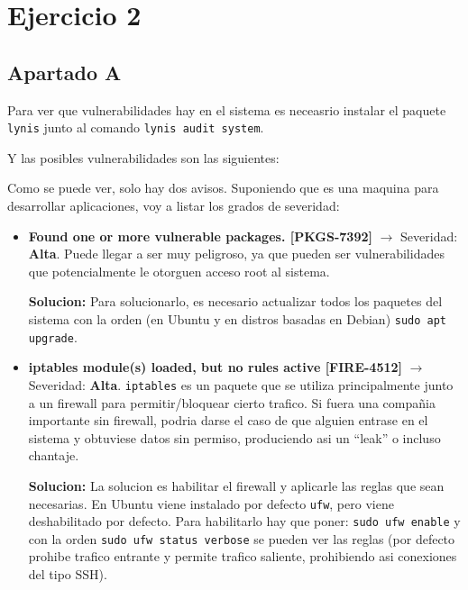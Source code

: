\documentclass{article}
\begin{document}

\section*{Ejercicio 2}
\subsection*{Apartado A}
Para ver que vulnerabilidades hay en el sistema es neceasrio instalar el paquete \verb|lynis| junto al comando \verb|lynis audit system|.


Y las posibles vulnerabilidades son las siguientes:


Como se puede ver, solo hay dos avisos. Suponiendo que es una maquina para desarrollar aplicaciones, voy a listar los grados de severidad:

\begin{itemize}
    \item \textbf{Found one or more vulnerable packages. [PKGS-7392]} $\rightarrow$ Severidad: \textbf{Alta}. Puede llegar a ser muy peligroso, ya que pueden ser vulnerabilidades que potencialmente le otorguen acceso root al sistema. 
    
    \textbf{Solucion: }Para solucionarlo, es necesario actualizar todos los paquetes del sistema con la orden (en Ubuntu y en distros basadas en Debian) \verb|sudo apt upgrade|.


    \item \textbf{iptables module(s) loaded, but no rules active [FIRE-4512]} $\rightarrow$ Severidad: \textbf{Alta}. \verb|iptables| es un paquete que se utiliza principalmente junto a un firewall para permitir/bloquear cierto trafico. Si fuera una compañia importante sin firewall, podria darse el caso de que alguien entrase en el sistema y obtuviese datos sin permiso, produciendo asi un ``leak'' o incluso chantaje.
    
    \textbf{Solucion: }La solucion es habilitar el firewall y aplicarle las reglas que sean necesarias. En Ubuntu viene instalado por defecto \verb|ufw|, pero viene deshabilitado por defecto. Para habilitarlo hay que poner: \verb|sudo ufw enable| y con la orden \verb|sudo ufw status verbose| se pueden ver las reglas (por defecto prohibe trafico entrante y permite trafico saliente, prohibiendo asi conexiones del tipo SSH).

\end{itemize}
\end{document}
